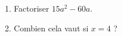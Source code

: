 
\begin{exercice}\label{exo2smath-0135}

    \begin{enumerate}
        \item
    Factoriser \( 15a^2-60a\). 
\item
    Combien cela vaut si \( x=4\) ?
    \end{enumerate}

\end{exercice}
